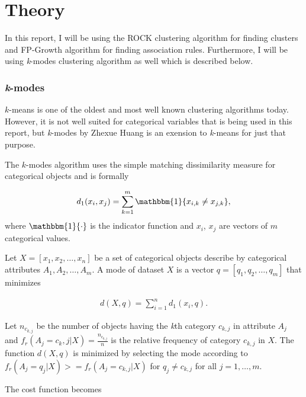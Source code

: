 \documentclass[result.tex]{subfiles}
\begin{document}
\section*{\centering Theory}

In this report, I will be using the ROCK clustering algorithm \cite{guha2000rock} for finding clusters and FP-Growth algorithm \cite{han2000mining} for finding association rules. Furthermore, I will be using \textit{k}-modes clustering algorithm as well which is described below.

\subsubsection*{\textit{k}-modes}

$k$-means is one of the oldest and most well known clustering algorithms today. However, it is not well suited for categorical variables that is being used in this report, but \textit{k}-modes by Zhexue Huang \cite{huang1998extensions} is an exension to \textit{k}-means for just that purpose.

The $k$-modes algorithm uses the simple matching dissimilarity measure for categorical objects and is formally

\begin{align*}
d_1(x_i, x_j) = \sum_{k=1}^{m}  \mathbbm{1} \{ x_{i,k} \neq x_{j,k} \},
\end{align*}
where $\mathbbm{1} \{ \cdot \}$ is the indicator function and $x_i$, $x_j$ are vectors of $m$ categorical values.

Let $X = \left[ x_1, x_2, \ldots, x_n \right]$ be a set of categorical objects describe by categorical attributes $A_1, A_2, \ldots, A_m$. A mode of dataset $X$ is a vector $q = \left[ q_1, q_2, \ldots, q_m \right]$ that minimizes

\begin{align*}
d(X, q) = \sum_{i=1}^{n} d_1(x_i, q).
\end{align*}

Let $n_{c_{k, j}}$ be the number of objects having the \textit{k}th category $c_{k,j}$ in attribute $A_j$ and $f_r(A_j = c_k,j | X) = \frac{n_{c_{k,j}}}{n}$ is the relative frequency of category $c_{k,j}$ in $X$. The function $d(X, q)$ is minimized by selecting the mode according to $f_r(A_j = q_j | X) >= f_r(A_j = c_{k,j} | X)$ for $q_j \neq c_{k,j}$ for all $j = 1, \ldots, m$.

The cost function becomes
\end{document}
